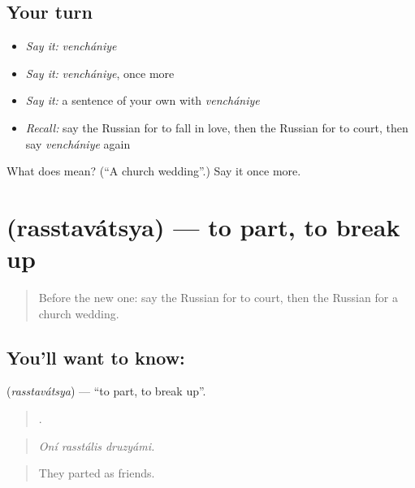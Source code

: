 \subsection*{Your turn}
\begin{itemize}
\raggedright
  \item \emph{Say it:} \emph{venchániye}
  \item \emph{Say it:} \emph{venchániye}, once more
  \item \emph{Say it:} a sentence of your own with \emph{venchániye}
  \item \emph{Recall:} say the Russian for to fall in love, then the Russian for to court, then say \emph{venchániye} again
\end{itemize}

\begin{tcolorbox}[breakable,colback=teal!4,colframe=teal!35!black,title={Before you move on}]
What does  mean? (\textquotedblleft{}A church wedding\textquotedblright{}.) Say it once more.
\end{tcolorbox}
\section[\texorpdfstring{\ru{расставаться} (rasstavátsya)}{расставаться (rasstavátsya)}]{ (rasstavátsya) — to part, to break up}

\label{lesson:RU-C306-rasstavatsya}



\begin{quote}
Before the new one: say the Russian for to court, then the Russian for a church wedding.
\end{quote}

\subsection*{You'll want to know: }
\textbf{} (\emph{rasstavátsya}) — \textquotedblleft{}to part, to break up\textquotedblright{}.

\begin{quote}
  .
\end{quote}

\begin{quote}
\emph{Oní rasstális druzyámi.}
\end{quote}

\begin{quote}
They parted as friends.
\end{quote}

